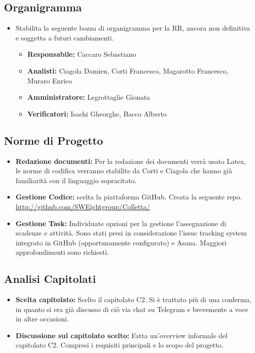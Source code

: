 \documentclass[a4paper, oneside, openany, dvipsnames, table]{article}
\begin{document}
\subsection{Organigramma}
\begin{itemize}
\item Stabilita la seguente bozza di organigramma per la RR, ancora non definitiva e soggetta a futuri cambiamenti.
	\begin{itemize}
	\item \textbf{Responsabile:} Caccaro Sebastiano
	\item \textbf{Analisti:} Ciagola Damien, Corti Francesco, Magarotto Francesco, Muraro Enrico
	\item \textbf{Amministratore:} Legrottaglie Gionata
	\item \textbf{Verificatori:} Isachi Gheorghe, Bacco Alberto
	\end{itemize}
\end{itemize}

\subsection{Norme di Progetto}
\begin{itemize}
\item \textbf{Redazione documenti:} Per la redazione dei documenti verrà usato Latex, le norme di codifica verranno stabilite da Corti e Ciagola che hanno già familiarità con il linguaggio sopracitato.
\item \textbf{Gestione Codice:} scelta la piattaforma GitHub. Creata la seguente repo. \url{http://github.com/SWEightgroup/Colletta/}
\item \textbf{Gestione Task:} Individuate opzioni per la gestione l'assegnazione di scadenze e attività. Sono stati presi in considerazione l’issue tracking system integrato in GitHub (opportunamente configurato) e Asana. Maggiori approfondimenti sono richiesti.
\end{itemize}

\subsection{Analisi Capitolati}
\begin{itemize}
\item \textbf{Scelta capitolato:} Scelto il capitolato C2. Si è trattato più di una conferma, in quanto si era già discusso di ciò via chat su Telegram e brevemente a voce in altre occasioni.
\item \textbf{Discussione sul capitolato scelto:} Fatta un’overview informale del capitolato C2. Compresi i requisiti principali e lo scopo del progetto.
\end{itemize}
\end{document}
